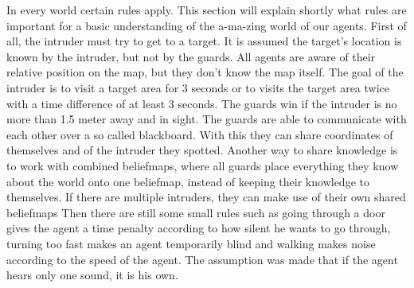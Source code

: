     In every world certain rules apply. This section will explain shortly what rules are important for a basic understanding of the a-ma-zing world of our agents.
    First of all, the intruder must try to get to a target. It is assumed the target's location is known by the intruder, but not by the guards. All agents are aware of their relative position on the map, but they don't know the map itself.
    The goal of the intruder is to visit a target area for 3 seconds or to visits the target area twice with a time difference of at least 3 seconds. The guards win if the intruder is no more than 1.5 meter away and in sight.
	The guards are able to communicate with each other over a so called blackboard. With this they can share coordinates of themselves and of the intruder they spotted. Another way to share knowledge is to work with combined beliefmaps, where all guards place everything they know about the world onto one beliefmap, instead of keeping their knowledge to themselves. If there are multiple intruders, they can make use of their own shared beliefmaps
	Then there are still some small rules such as going through a door gives the agent a time penalty according to how silent he wants to go through, turning too fast makes an agent temporarily blind and walking makes noise according to the speed of the agent. The assumption was made that if the agent hears only one sound, it is his own.
	